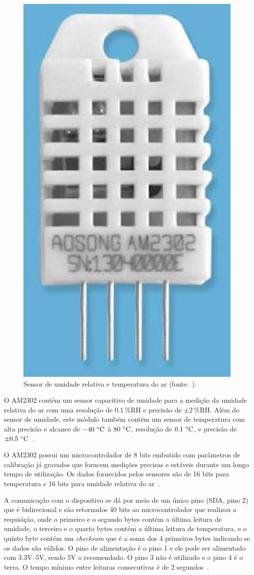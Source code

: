 		\begin{figure}[!htbp]
		\begin{center}
		\includegraphics[width=.4\textwidth]{figuras/am2302.eps}
		\caption{\label{fig:AM2302}Sensor de umidade relativa e temperatura do ar (fonte:~).}
		\end{center}
		\end{figure}

		O AM2302 contém um sensor capacitivo de umidade para a medição da umidade relativa
		do ar com uma resolução de $0.1~\%\textrm{RH}$ e precisão de $\pm 2~\%\textrm{RH}$.
		Além do sensor de umidade, este módulo também contém um sensor de temperatura com
		alta precisão e alcance de $-40~\celsius$ à $80~\celsius$, resolução de $0.1~\celsius$,
		e precisão de $\pm 0.5~\celsius$~\cite{aosong}.

		O AM2302 possui um microcontrolador de 8 bits embutido com parâmetros de calibração já gravados
		que forncem medições precisas e estáveis durante um longo tempo de utilização.
		Os dados fornecidos pelos sensores são de 16 bits para temperatura e
		16 bits para umidade relativa do ar~\cite{aosong}.

		A comunicação com o dispositivo se dá por meio de um único pino (SDA, pino 2) que é
		bidirecional e são retornados 40 bits ao microcontrolador que realizou a requisição, onde
		o primeiro e o segundo bytes contém a última leitura de umidade,
		o terceiro e o quarto bytes contém a última leitura de temperatura,
		e o quinto byte contém um \textit{checksum} que é a soma dos 4 primeiros bytes
		indicando se os dados são válidos.
		O pino de alimentação é o pino 1 e ele pode ser alimentado com $3.3\textrm{V}$--$5\textrm{V}$,
		sendo $5\textrm{V}$ o recomendado. O pino 3 não é utilizado e o pino 4 é o terra.
		O tempo mínimo entre leituras consecutivas é de 2 segundos~\cite{aosong}.

